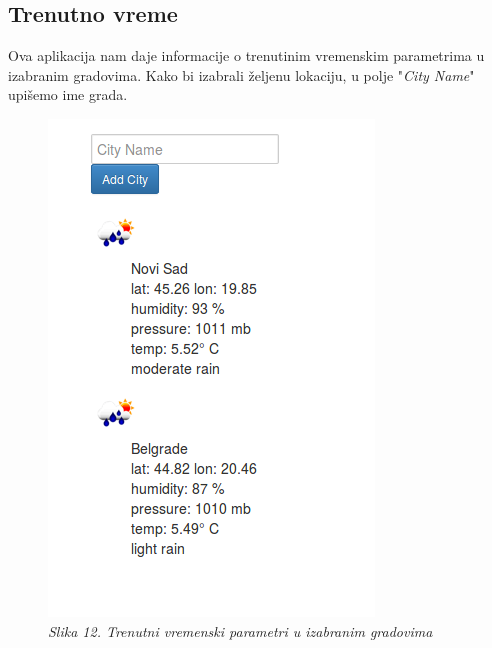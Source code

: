 \documentclass[12pt]{article}
\begin{document}
\subsection{Trenutno vreme}
Ova aplikacija nam daje informacije o trenutinim vremenskim parametrima u izabranim gradovima. Kako bi izabrali željenu lokaciju, u polje "\textit{City Name}" upišemo ime grada.
\begin{figure}[!htb]
	\centering
	\includegraphics[width=0.5\linewidth]{vreme.png}
	\caption*{\textsl{Slika 12. Trenutni vremenski parametri u izabranim gradovima}}
\end{figure}
\end{document}
